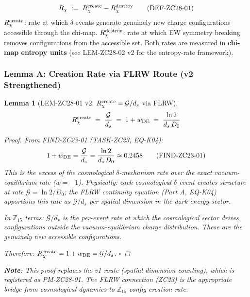 \documentclass[12pt, a4paper]{article}
\newtheorem{lemma}{Lemma}[section]
\begin{document}
\begin{formalbox}[title={DEF-ZC28-01: Chi-Map Net Rate $R_\chi$
  (unchanged)}]
\[
  R_\chi \;:=\; R_\chi^{\rm create} - R_\chi^{\rm destroy}
  \tag{DEF-ZC28-01}
\]
$R_\chi^{\rm create}$: rate at which $\delta$-events generate
genuinely new charge configurations accessible through the chi-map.
$R_\chi^{\rm destroy}$: rate at which EW symmetry breaking removes
configurations from the accessible set.
Both rates are measured in \textbf{chi-map entropy units}
(see LEM-ZC28-02 v2 for the entropy-rate framework).
\end{formalbox}

\subsubsection{Lemma A: Creation Rate via FLRW Route (v2 Strengthened)}

\begin{lemma}[LEM-ZC28-01 v2: $R_\chi^{\rm create}
  = \mathcal{G}/d_s$ via FLRW]
\label{zc28:lem:create}
\[
  R_\chi^{\rm create}
  \;=\; \frac{\mathcal{G}}{d_s}
  \;=\; 1 + w_{\rm DE}
  \;=\; \frac{\ln 2}{d_s\,D_0}
\]

\begin{proof}
From FIND-ZC23-01 (TASK-ZC23, EQ-K04):
\[
  1 + w_{\rm DE} = \frac{\mathcal{G}}{d_s}
  = \frac{\ln 2}{d_s\,D_0}
  \approx 0.2458
  \tag{FIND-ZC23-01}
\]
This is the excess of the cosmological $\delta$-mechanism rate
over the exact vacuum-equilibrium rate ($w = -1$).
Physically: each cosmological $\delta$-event creates structure
at rate $\mathcal{G} = \ln 2/D_0$; the FLRW continuity equation
(Part A, EQ-K04) apportions this rate as $\mathcal{G}/d_s$
per spatial dimension in the dark-energy sector.

In $\mathbb{Z}_{15}$ terms: $\mathcal{G}/d_s$ is the per-event
rate at which the cosmological sector drives configurations
\emph{outside} the vacuum-equilibrium charge distribution.
These are the genuinely new accessible configurations.

Therefore: $R_\chi^{\rm create} = 1 + w_{\rm DE}
= \mathcal{G}/d_s$.
\hfill$\square$
\end{proof}

\medskip
\textbf{Note:} This proof replaces the v1 route (spatial-dimension
counting), which is registered as PM-ZC28-01. The FLRW connection
(ZC23) is the appropriate bridge from cosmological dynamics to
$\mathbb{Z}_{15}$ config-creation rate.
\end{lemma}
\end{document}
